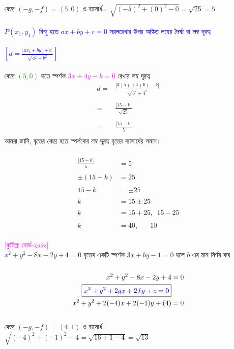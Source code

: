 \documentclass{article}
\begin{document}
\\
কেন্দ্র 	$(-g,-f)=(5,0)$ ও ব্যাসার্ধ= $\sqrt{(-5)^2+(0)^2-0}=\sqrt{25}=5$\\
\\  
\textcolor{blue}{$P(x_1,y_1)$ বিন্দু হতে  $ax+by+c=0$ সরলরেখার উপর অঙ্কিত লম্বের দৈর্ঘ্য বা লম্ব দূরত্ব \\
	\\
	$\left[d=\frac{|ax_1+by_1+c|}{\sqrt{a^2+b^2}}\right]$}\\
\\
কেন্দ্র \textcolor{green}{$(5,0)$} হতে স্পর্শক \textcolor{magenta}{$3x+4y-k=0$}  রেখার লম্ব দূরত্ব \\
\begin{align*}
	d=	&\frac{|3(5)+4(0)-k|}{\sqrt{3^2+4^2}}\\
	\\
	=	&	\frac{|15-k|}{\sqrt{25}}\\
	\\
	=	&	\frac{|15-k|}{5}\\
\end{align*}
আমরা জানি, বৃত্তের কেন্দ্র হতে স্পর্শকের লম্ব দূরত্ব বৃত্তের ব্যাসার্ধের সমান। \\
\\ 
\begin{align*}
	\frac{|15-k|}{5}&=5\\
	\\
	\pm (15-k)&=25\\
	\\
	15-k&=\pm 25\\
	\\
	k&=15\pm 25\\
	\\
	k&=15+25,\,\,\,15-25\\
	\\
	k&=40,\,\,\,-10
\end{align*}
\\ 
\textcolor{magenta}{[কুমিল্লা বোর্ড-২০১২]}\\
$x^2+y^2-8x-2y+4=0$ বৃত্তের একটি স্পর্শক  $3x+by-1=0$ হলে  $b$ এর মান নির্ণয় কর\\
\\
	\begin{align*}
	x^2+y^2-8x-2y+4&=0\\
	\boxed{\textcolor{blue}{x^2+y^2+2gx+2fy+c=0}}&\\
	x^2+y^2+2(-4)x+2(-1)y+(4)&=0
\end{align*}
\\
কেন্দ্র 	$(-g,-f)=(4,1)$ ও ব্যাসার্ধ= $\sqrt{(-4)^2+(-1)^2-4}=\sqrt{16+1-4}=\sqrt{13}$\\
\end{document}
